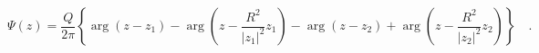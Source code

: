 \begin{equation}
\Psi(z)=\frac{Q}{2\pi}\left\{\arg(z-z_1)-\arg\left(z-\frac{R^2}{|z_1|^2}z_1\right)-\arg(z-z_2)+\arg\left(z-\frac{R^2}{|z_2|^2}z_2\right)\right\}\quad.
\end{equation}

